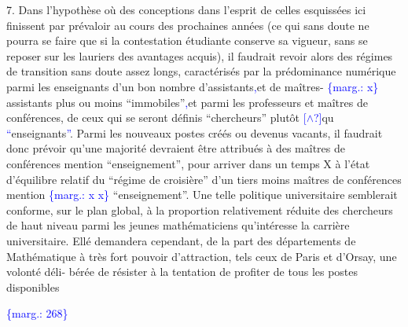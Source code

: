 \documentclass[11pt]{article}
\newcommand{\scanpage}[1]{\par\bigskip\noindent{\small\sffamily[scan #1]}\par}
\newcommand{\mspage}[1]{{\small\sffamily[p.\,#1]}}
\newcommand{\hand}[1]{\textcolor{blue}{#1}}
\let\over\relax
\newcommand{\over}[2]{\textcolor{gray}{#1}\textcolor{blue}{\ensuremath{^{\!\nearrow}}#2}}
\newcommand{\margin}[1]{\textcolor{blue}{\{\textsf{marg.:} #1\}}}
\newcommand{\unsure}[1]{[#1?]}
\newcommand{\illegible}[1]{[\textsf{illeg.\ #1}]}
\begin{document}
7. Dans l'hypothèse où des conceptions dans l'esprit de celles esquissées ici
finissent par prévaloir au cours des prochaines années (ce qui sans doute ne
pourra se faire que si la contestation étudiante conserve sa vigueur, sans se
reposer sur les lauriers des avantages acquis), il faudrait revoir alors des
régimes de transition sans doute assez longs, caractérisés par la prédominance
numérique parmi les enseignants d'un bon nombre d'assistants\hand{,}et de maîtres- \margin{x}
assistants plus ou moins ``immobiles''\hand{,}et parmi les professeurs et maîtres de
conférences, de ceux qui se seront définis ``chercheurs'' plutôt \hand{\unsure{$\wedge$}}qu\over{'}{e} \hand{``}enseignants\hand{''}.
Parmi les nouveaux postes créés ou devenus vacants, il faudrait donc prévoir
qu'une majorité devraient être attribués à des maîtres de conférences mention
``enseignement'', pour arriver dans un temps X à l'état d'équilibre relatif du
``régime de croisière'' d'un tiers \over{\illegible{1}}{du} moins \over{\illegible{1}}{de} maîtres de conférences mention \margin{x x}
``enseignement''. Une telle politique universitaire semblerait conforme, sur
le plan global, à la proportion relativement réduite des chercheurs de haut
niveau parmi les jeunes mathématiciens qu'intéresse la carrière universitaire.
Ellé demandera cependant, de la part des départements de Mathématique à très
fort pouvoir d'attraction, tels ceux de Paris et d'Orsay, une volonté déli-%
bérée de résister à la tentation de profiter de tous les postes disponibles

\margin{268}

\clearpage
\scanpage{119/269}
\mspage{16}
\end{document}
